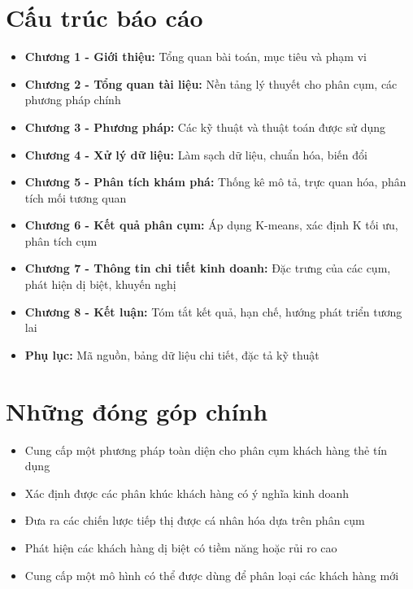 \section{Cấu trúc báo cáo}

\begin{itemize}
    \item \textbf{Chương 1 - Giới thiệu:} Tổng quan bài toán, mục tiêu và phạm vi
    \item \textbf{Chương 2 - Tổng quan tài liệu:} Nền tảng lý thuyết cho phân cụm, các phương pháp chính
    \item \textbf{Chương 3 - Phương pháp:} Các kỹ thuật và thuật toán được sử dụng
    \item \textbf{Chương 4 - Xử lý dữ liệu:} Làm sạch dữ liệu, chuẩn hóa, biến đổi
    \item \textbf{Chương 5 - Phân tích khám phá:} Thống kê mô tả, trực quan hóa, phân tích mối tương quan
    \item \textbf{Chương 6 - Kết quả phân cụm:} Áp dụng K-means, xác định K tối ưu, phân tích cụm
    \item \textbf{Chương 7 - Thông tin chi tiết kinh doanh:} Đặc trưng của các cụm, phát hiện dị biệt, khuyến nghị
    \item \textbf{Chương 8 - Kết luận:} Tóm tắt kết quả, hạn chế, hướng phát triển tương lai
    \item \textbf{Phụ lục:} Mã nguồn, bảng dữ liệu chi tiết, đặc tả kỹ thuật
\end{itemize}

\section{Những đóng góp chính}

\begin{itemize}
    \item Cung cấp một phương pháp toàn diện cho phân cụm khách hàng thẻ tín dụng
    \item Xác định được các phân khúc khách hàng có ý nghĩa kinh doanh
    \item Đưa ra các chiến lược tiếp thị được cá nhân hóa dựa trên phân cụm
    \item Phát hiện các khách hàng dị biệt có tiềm năng hoặc rủi ro cao
    \item Cung cấp một mô hình có thể được dùng để phân loại các khách hàng mới
\end{itemize}

